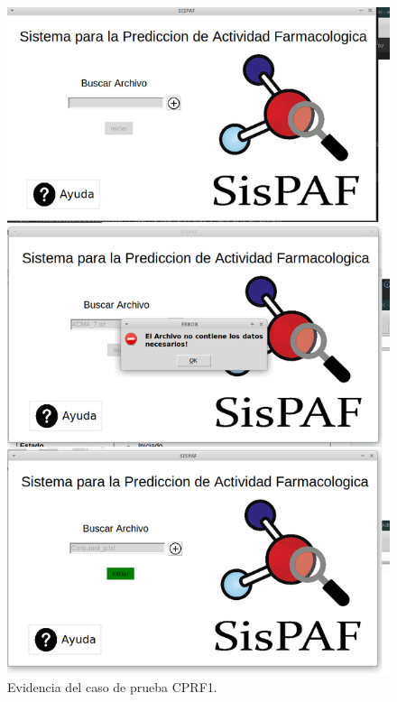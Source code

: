 \begin{figure}[H]
    \centering
    \includegraphics[scale=0.28]{Anexo/imagenes/Imagenes_Pruebas/CPRF1.png}
    \caption{Evidencia del caso de prueba CPRF1.}
    \label{CPRF1}
\end{figure}

